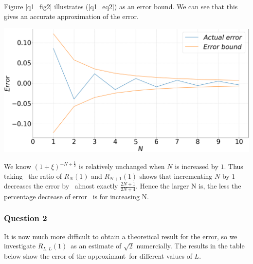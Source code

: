 \documentclass[12pt, a4paper]{article}
\begin{document}
Figure \ref{q1_fig2} illustrates (\ref{q1_eq2}) as an error bound. 
We can see that this gives an accurate approximation of the error.

\vspace{0.3cm}
\begin{minipage}{\textwidth}
	\includegraphics[width=\linewidth]{q1_fig2}
	\label{q1_fig2}
\end{minipage}
\vspace{0.4cm}

We know $(1+\xi)^{-N + \frac{1}{2}}$ is relatively unchanged when $N$ is increased by $1$. Thus taking \
the ratio of $R_{N}(1)$ and $R_{N+1}(1)$ shows that incrementing $N$ by $1$ decreases the error by \
almost exactly $\frac{ 2N+1 }{ 2N+4 }$. Hence the larger N is, the less the percentage decrease of error \
is for increasing N.

\newpage

\subsubsection*{Question 2}

It is now much more difficult to obtain a theoretical result for the error, so we investigate $R_{L,L}(1)$\
as an estimate of $\sqrt{2}$ numercially. The results in the table below show the error of the approximant\
for different values of $L$.
\vspace{0.3cm}
\end{document}
